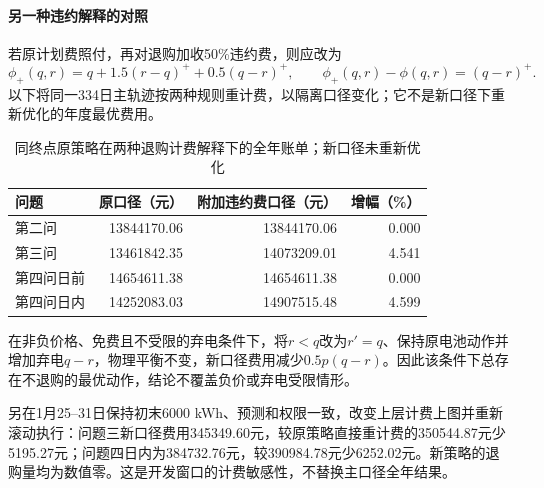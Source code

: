 
\paragraph{另一种违约解释的对照}
若原计划费照付，再对退购加收50\%违约费，则应改为
\begin{equation}
 \phi_{+}(q,r)=q+1.5(r-q)^++0.5(q-r)^+,
 \qquad \phi_{+}(q,r)-\phi(q,r)=(q-r)^+.
\end{equation}
以下将同一334日主轨迹按两种规则重计费，以隔离口径变化；它不是新口径下重新优化的年度最优费用。
\begin{table}[htbp]
\centering
\caption{同终点原策略在两种退购计费解释下的全年账单；新口径未重新优化}
\begin{tabular}{lrrr}
\toprule
问题 & 原口径（元） & 附加违约费口径（元） & 增幅（\%）\\
\midrule
第二问 & 13844170.06 & 13844170.06 & 0.000\\
第三问 & 13461842.35 & 14073209.01 & 4.541\\
第四问日前 & 14654611.38 & 14654611.38 & 0.000\\
第四问日内 & 14252083.03 & 14907515.48 & 4.599\\
\bottomrule
\end{tabular}
\end{table}

在非负价格、免费且不受限的弃电条件下，将$r<q$改为$r'=q$、保持原电池动作并增加弃电$q-r$，物理平衡不变，新口径费用减少$0.5p(q-r)$。因此该条件下总存在不退购的最优动作，结论不覆盖负价或弃电受限情形。

另在1月25--31日保持初末6000 kWh、预测和权限一致，改变上层计费上图并重新滚动执行：问题三新口径费用345349.60元，较原策略直接重计费的350544.87元少5195.27元；问题四日内为384732.76元，较390984.78元少6252.02元。新策略的退购量均为数值零。这是开发窗口的计费敏感性，不替换主口径全年结果。
